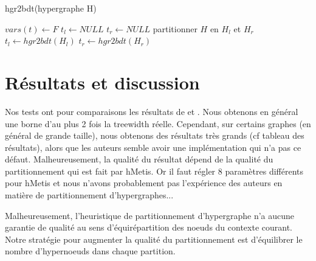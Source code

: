 \documentclass{article}
\begin{document}
\begin{algorithm}
  \caption{hgr2bdt(hypergraphe H)}
  \begin{algorithmic}
        \STATE $vars(t) \gets F$
        \STATE $t_l \gets NULL$
        \STATE $t_r \gets NULL$
    \ELSE
        \STATE partitionner $H$ en $H_l$ et $H_r$
        \STATE $t_l \gets hgr2bdt(H_l)$
        \STATE $t_r \gets hgr2bdt(H_r)$
    \ENDIF
  \end{algorithmic}
  \label{algo2}
\end{algorithm}



\section{Résultats et discussion}
Nos tests ont pour comparaisons les résultats de \cite{tree} et
\cite{ref}.  Nous obtenons en général une borne d'au plus 2 fois la
treewidth réelle.  Cependant, sur certains graphes (en général de
grande taille), nous obtenons des résultats très grands (cf tableau
des résultats), alors que les auteurs semble avoir une implémentation
qui n'a pas ce défaut.  Malheureusement, la qualité du résultat dépend
de la qualité du partitionnement qui est fait par hMetis. Or il faut
régler 8 paramètres différents pour hMetis et nous n'avons
probablement pas l'expérience des auteurs en matière de
partitionnement d'hypergraphes...


Malheureusement, l'heuristique de partitionnement d'hypergraphe n'a
aucune garantie de qualité au sens d'équirépartition des noeuds du
contexte courant. Notre stratégie pour augmenter la qualité du
partitionnement est d'équilibrer le nombre d'hypernoeuds dans chaque
partition.
\end{document}
